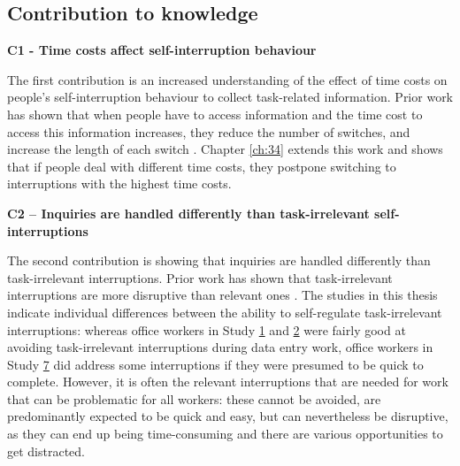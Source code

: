 

\subsection{Contribution to knowledge}
\textbf{C1 - Time costs affect self-interruption behaviour}

The first contribution is an increased understanding of the effect of time costs on people’s self-interruption behaviour to collect task-related information. Prior work has shown that when people have to access information and the time cost to access this information increases, they reduce the number of switches, and increase the length of each switch \citep{Gray2006}. Chapter \ref{ch:34} extends this work and shows that if people deal with different time costs, they postpone switching to interruptions with the highest time costs. 

\textbf{C2 – Inquiries are handled differently than task-irrelevant self-interruptions}

The second contribution is showing that inquiries are handled differently than task-irrelevant interruptions. Prior work has shown that task-irrelevant interruptions are more disruptive than relevant ones \citep{Iqbal2008}. The studies in this thesis indicate individual differences between the ability to self-regulate task-irrelevant interruptions: whereas office workers in Study \hyperref[st:Study1]{1} and \hyperref[st:Study2]{2} were fairly good at avoiding task-irrelevant interruptions during data entry work, office workers in Study \hyperref[st:Study7]{7} did address some interruptions if they were presumed to be quick to complete. However, it is often the relevant interruptions that are needed for work that can be problematic for all workers: these cannot be avoided, are predominantly expected to be quick and easy, but can nevertheless be disruptive, as they can end up being time-consuming and there are various opportunities to get distracted. 

